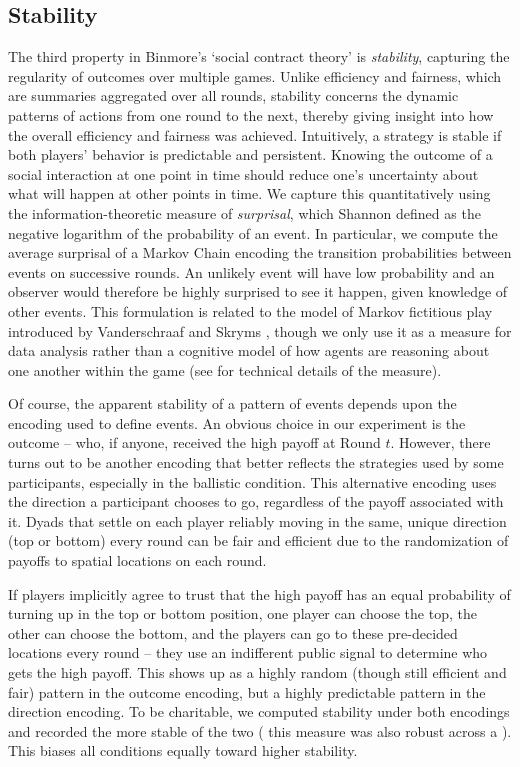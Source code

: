 \documentclass[10pt,letterpaper]{article}
\begin{document}
\subsection*{Stability}

The third property in Binmore's `social contract theory' is \emph{stability}, capturing the regularity of outcomes over multiple games. Unlike efficiency and fairness, which are summaries aggregated over all rounds, stability concerns the dynamic patterns of actions from one round to the next, thereby giving insight into how the overall efficiency and fairness was achieved. Intuitively, a strategy is stable if both players' behavior is predictable and persistent. Knowing the outcome of a social interaction at one point in time should reduce one's uncertainty about what will happen at other points in time. We capture this quantitatively using the information-theoretic measure of \emph{surprisal}, which Shannon \cite{Shannon48} defined as the negative logarithm of the probability of an event. In particular, we compute the average surprisal of a Markov Chain encoding the transition probabilities between events on successive rounds. An unlikely event will have low probability and an observer would therefore be highly surprised to see it happen, given knowledge of other events.  This formulation is related to the model of Markov fictitious play introduced by Vanderschraaf and Skryms \cite{VanderschraafSkyrms03_LearningToTakeTurns}, though we only use it as a measure for data analysis rather than a cognitive model of how agents are reasoning about one another within the game (see  for technical details of the measure).

Of course, the apparent stability of a pattern of events depends upon the encoding used to define events. An obvious choice in our experiment is the outcome -- who, if anyone, received the high payoff at Round $t$. However, there turns out to be another encoding that better reflects the strategies used by some participants, especially in the ballistic condition. This alternative encoding uses the direction a participant chooses to go, regardless of the payoff associated with it. Dyads that settle on each player reliably moving in the same, unique direction (top or bottom) every round can be fair and efficient due to the randomization of payoffs to spatial locations on each round. 

If players implicitly agree to trust that the high payoff has an equal probability of turning up in the top or bottom position, one player can  choose the top, the other can choose the bottom, and the players can go to these pre-decided locations every round -- they use an indifferent public signal to determine who gets the high payoff. This shows up as a highly random (though still efficient and fair) pattern in the outcome encoding, but a highly predictable pattern in the direction encoding. To be charitable, we computed stability under both encodings and recorded the more stable of the two ( this measure was also robust across a ). This biases all conditions equally toward higher stability. 
\end{document}
